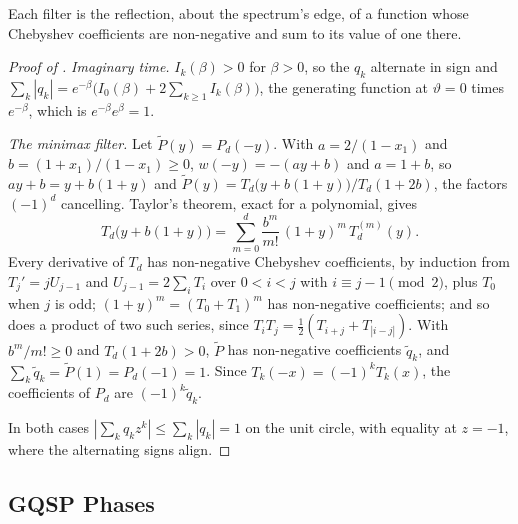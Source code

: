 Each filter is the reflection, about the spectrum's edge, of a function whose Chebyshev coefficients are non-negative and sum to its value of one there.

\begin{proof}[Proof of ]
\emph{Imaginary time.} $I_k(\beta)>0$ for $\beta>0$, so the $q_k$ alternate in sign and $\sum_k|q_k|=e^{-\beta}\bigl(I_0(\beta)+2\sum_{k\ge1}I_k(\beta)\bigr)$, the generating function at $\vartheta=0$ times $e^{-\beta}$, which is $e^{-\beta}e^{\beta}=1$.

\emph{The minimax filter.} Let $\tilde P(y)=P_d(-y)$. With $a=2/(1-x_1)$ and $b=(1+x_1)/(1-x_1)\ge0$, $w(-y)=-(ay+b)$ and $a=1+b$, so $ay+b=y+b(1+y)$ and $\tilde P(y)=T_d\bigl(y+b(1+y)\bigr)/T_d(1+2b)$, the factors $(-1)^d$ cancelling. Taylor's theorem, exact for a polynomial, gives
\begin{equation*}
    T_d\bigl(y+b(1+y)\bigr)=\sum_{m=0}^{d}\frac{b^m}{m!}\,(1+y)^m\,T_d^{(m)}(y).
\end{equation*}
Every derivative of $T_d$ has non-negative Chebyshev coefficients, by induction from $T_j'=jU_{j-1}$ and $U_{j-1}=2\sum_iT_i$ over $0<i<j$ with $i\equiv j-1\pmod 2$, plus $T_0$ when $j$ is odd; $(1+y)^m=(T_0+T_1)^m$ has non-negative coefficients; and so does a product of two such series, since $T_iT_j=\tfrac12(T_{i+j}+T_{|i-j|})$. With $b^m/m!\ge0$ and $T_d(1+2b)>0$, $\tilde P$ has non-negative coefficients $\tilde q_k$, and $\sum_k\tilde q_k=\tilde P(1)=P_d(-1)=1$. Since $T_k(-x)=(-1)^kT_k(x)$, the coefficients of $P_d$ are $(-1)^k\tilde q_k$.

In both cases $|\sum_kq_kz^k|\le\sum_k|q_k|=1$ on the unit circle, with equality at $z=-1$, where the alternating signs align.
\end{proof}

\subsection{GQSP Phases}
\label{app:gqsp-phases}

